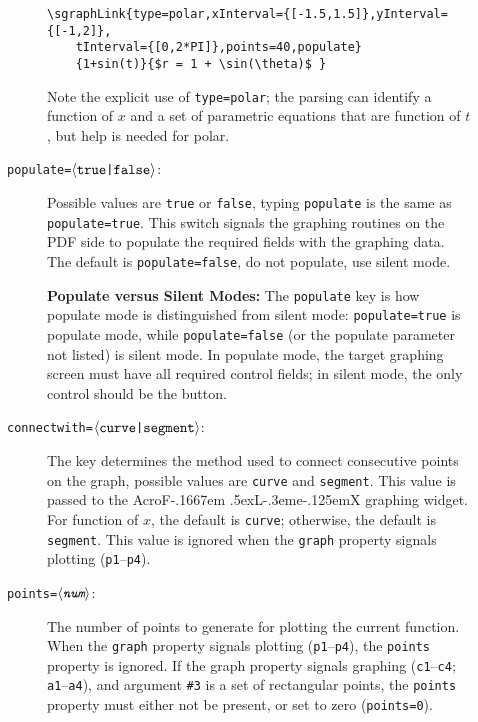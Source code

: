 \documentclass{article}
\makeatletter
\def\anglemeta#1{$\langle\textit{\texttt{#1}}\rangle$}
\let\meta\anglemeta
\def\AcroFLeX{AcroF\kern-.1667em
    \lower.5ex\hbox{L}\kern-.3eme\kern-.125emX\@}
\let\amtIndent\leftmargini
\makeatother
\begin{document}
\begin{description}
\begin{description}
\begin{Verbatim}[xleftmargin=\amtIndent,fontsize=\footnotesize]
\sgraphLink{type=polar,xInterval={[-1.5,1.5]},yInterval={[-1,2]},
    tInterval={[0,2*PI]},points=40,populate}
    {1+sin(t)}{$r = 1 + \sin(\theta)$ }
\end{Verbatim}

    Note the explicit use of \texttt{type=polar}; the
    parsing can identify a function of $x$ and a set of
    parametric equations that are function of $t$, but help
    is needed for polar.

    \item [\texttt{populate=\meta{\upshape{true|false}}}:] Possible
        values are \texttt{true} or \texttt{false}, typing
        \texttt{populate} is the same as \texttt{populate=true}. This
        switch signals the graphing routines on the PDF side to populate
        the required fields with the graphing data. The default is
        \texttt{populate=false}, do not populate, use silent mode.

        \textbf{Populate versus Silent Modes:} The \texttt{populate} key
        is how populate mode is distinguished from silent mode:
        \texttt{populate=true} is populate mode, while \texttt{populate=false}
        (or the populate parameter not listed) is silent mode. In
        populate mode, the target graphing screen must have all required
        control fields; in silent mode, the only control should be the
         button.

    \item [\texttt{connectwith=\meta{\upshape{curve|segment}}}:] The key
        determines the method used to connect consecutive points on the
        graph, possible values are \texttt{curve} and \texttt{segment}.
        This value is passed to the {\AcroFLeX} graphing widget. For
        function of $x$, the default is \texttt{curve}; otherwise, the
        default is \texttt{segment}. This value is ignored when the
        \texttt{graph} property signals plotting
        (\texttt{p1}--\texttt{p4}).

    \item [\texttt{points=\meta{num}}:] The number of points to generate for
        plotting the current function. When the \texttt{graph}
        property signals plotting (\texttt{p1}--\texttt{p4}), the
        \texttt{points} property is ignored. If the graph property
        signals graphing (\texttt{c1}--\texttt{c4};
        \texttt{a1}--\texttt{a4}), and argument \texttt{\#3} is a
        set of rectangular points, the \texttt{points} property must
        either not be present, or set to zero (\texttt{points=0}).


\end{description}
\end{description}
\end{document}
